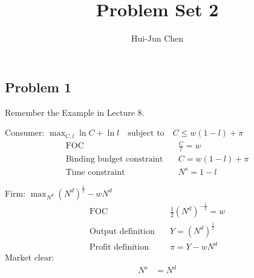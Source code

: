 \documentclass[14pt]{extarticle}
\title{Problem Set 2}
\author{Hui-Jun Chen}
\newcommand{\red}[1]{\textcolor{red}{#1}}
\newcommand{\showAns}{\setboolean{showAns}{true}}
\begin{document}
\maketitle





\begin{Exercise}

\section*{Problem 1}

Remember the Example in Lecture 8.

    Consumer: $ \max_{C, l} \ln C + \ln l \quad \text{subject to} \quad C \le w( 1-l ) + \pi $
    \begin{align}
        \text{FOC} \quad
            & \frac{C}{l} = w
            \label{eq:consumerFOC}
        \\
        \text{Binding budget constraint} \quad
            & C = w ( 1-l ) + \pi
            \label{eq:binding_budget}
        \\
        \text{Time constraint} \quad
            & N^{s} = 1 - l
            \label{eq:time_budget}
    \end{align}

    Firm: $ \max_{N^{d}} ( N^{d} )^{\frac{1}{2}} - w N^{d} $
    \begin{align}
        \text{FOC} \quad
            & \frac{1}{2} ( N^{d} )^{- \frac{1}{2}} = w
            \label{eq:firmFOC}
        \\
        \text{Output definition} \quad
            & Y = ( N^{d} )^{\frac{1}{2}}
            \label{eq:outputDef}
        \\
        \text{Profit definition} \quad
            & \pi = Y - w N^{d}
            \label{eq:profitDef}
    \end{align}
    Market clear:
    \begin{align}
        N^{s} & = N^{d}
        \label{eq:laborClear}
    \end{align}


\end{Exercise}
\end{document}
